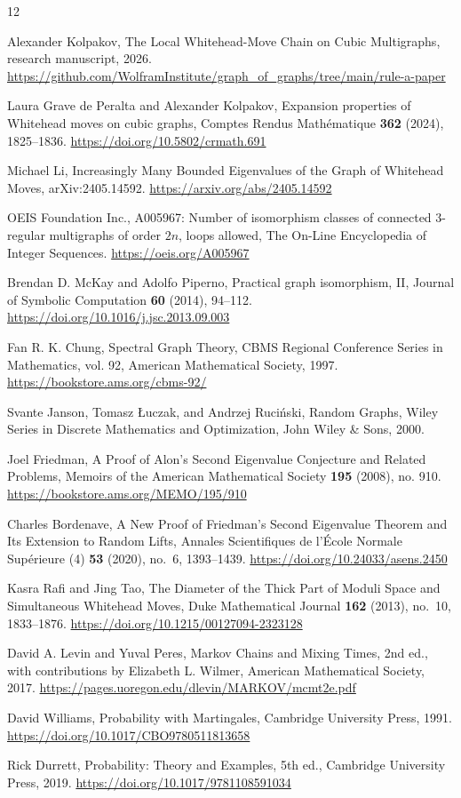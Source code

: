 \documentclass[11pt]{article}
\theoremstyle{definition}
\begin{document}
\begin{thebibliography}{12}

Alexander Kolpakov,
The Local Whitehead-Move Chain on Cubic Multigraphs,
research manuscript, 2026.
\url{https://github.com/WolframInstitute/graph_of_graphs/tree/main/rule-a-paper}

Laura Grave de Peralta and Alexander Kolpakov,
Expansion properties of Whitehead moves on cubic graphs,
Comptes Rendus Mathématique \textbf{362} (2024), 1825--1836.
\url{https://doi.org/10.5802/crmath.691}

Michael Li,
Increasingly Many Bounded Eigenvalues of the Graph of Whitehead Moves,
arXiv:2405.14592.
\url{https://arxiv.org/abs/2405.14592}

OEIS Foundation Inc.,
A005967: Number of isomorphism classes of connected 3-regular multigraphs of order $2n$, loops allowed,
The On-Line Encyclopedia of Integer Sequences.
\url{https://oeis.org/A005967}

Brendan D. McKay and Adolfo Piperno,
Practical graph isomorphism, II,
Journal of Symbolic Computation \textbf{60} (2014), 94--112.
\url{https://doi.org/10.1016/j.jsc.2013.09.003}

Fan R. K. Chung,
Spectral Graph Theory,
CBMS Regional Conference Series in Mathematics, vol. 92,
American Mathematical Society, 1997.
\url{https://bookstore.ams.org/cbms-92/}

Svante Janson, Tomasz {\L}uczak, and Andrzej Ruci\'nski,
Random Graphs,
Wiley Series in Discrete Mathematics and Optimization,
John Wiley \& Sons, 2000.

Joel Friedman,
A Proof of Alon's Second Eigenvalue Conjecture and Related Problems,
Memoirs of the American Mathematical Society \textbf{195} (2008), no. 910.
\url{https://bookstore.ams.org/MEMO/195/910}

Charles Bordenave,
A New Proof of Friedman's Second Eigenvalue Theorem and Its Extension to Random Lifts,
Annales Scientifiques de l'\'Ecole Normale Sup\'erieure (4) \textbf{53}
(2020), no.~6, 1393--1439.
\url{https://doi.org/10.24033/asens.2450}

Kasra Rafi and Jing Tao,
The Diameter of the Thick Part of Moduli Space and Simultaneous
Whitehead Moves,
Duke Mathematical Journal \textbf{162} (2013), no.~10, 1833--1876.
\url{https://doi.org/10.1215/00127094-2323128}

David A. Levin and Yuval Peres,
Markov Chains and Mixing Times,
2nd ed., with contributions by Elizabeth L. Wilmer,
American Mathematical Society, 2017.
\url{https://pages.uoregon.edu/dlevin/MARKOV/mcmt2e.pdf}

David Williams,
Probability with Martingales,
Cambridge University Press, 1991.
\url{https://doi.org/10.1017/CBO9780511813658}

Rick Durrett,
Probability: Theory and Examples,
5th ed., Cambridge University Press, 2019.
\url{https://doi.org/10.1017/9781108591034}

\end{thebibliography}
\end{document}
